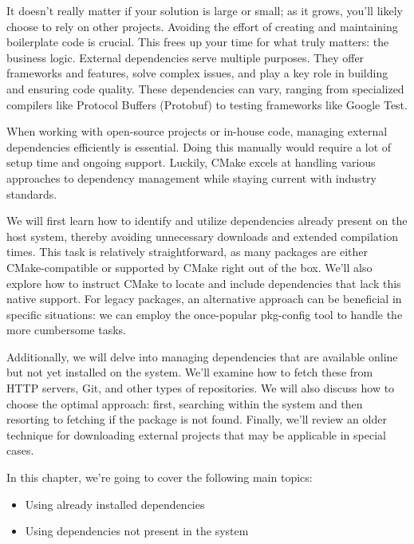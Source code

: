 It doesn’t really matter if your solution is large or small; as it grows, you’ll likely choose to rely on other projects. Avoiding the effort of creating and maintaining boilerplate code is crucial. This frees up your time for what truly matters: the business logic. External dependencies serve multiple purposes. They offer frameworks and features, solve complex issues, and play a key role in building and ensuring code quality. These dependencies can vary, ranging from specialized compilers like Protocol Buffers (Protobuf) to testing frameworks like Google Test.

When working with open-source projects or in-house code, managing external dependencies efficiently is essential. Doing this manually would require a lot of setup time and ongoing support. Luckily, CMake excels at handling various approaches to dependency management while staying current with industry standards.

We will first learn how to identify and utilize dependencies already present on the host system, thereby avoiding unnecessary downloads and extended compilation times. This task is relatively straightforward, as many packages are either CMake-compatible or supported by CMake right out of the box. We’ll also explore how to instruct CMake to locate and include dependencies that lack this native support. For legacy packages, an alternative approach can be beneficial in specific situations: we can employ the once-popular pkg-config tool to handle the more cumbersome tasks.

Additionally, we will delve into managing dependencies that are available online but not yet installed on the system. We’ll examine how to fetch these from HTTP servers, Git, and other types of repositories. We will also discuss how to choose the optimal approach: first, searching within the system and then resorting to fetching if the package is not found. Finally, we’ll review an older technique for downloading external projects that may be applicable in special cases.

In this chapter, we’re going to cover the following main topics:

\begin{itemize}
\item
Using already installed dependencies

\item
Using dependencies not present in the system
\end{itemize}

















